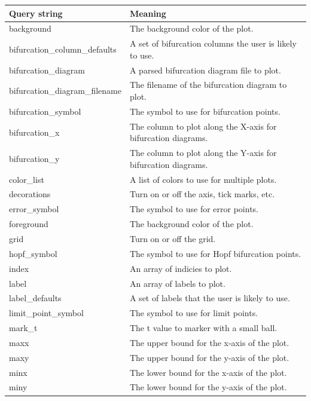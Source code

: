 \documentclass[12pt]{report}
\begin{document}
 \begin{longtable}{| l | l |}
 \hline
 Query string & Meaning \\
 \hline
 background  &  The background color of the plot. \\
 \hline
 bifurcation\_column\_defaults  & A set of bifurcation columns the user is likely to use. \\
 \hline
 bifurcation\_diagram  &  A parsed bifurcation diagram file to plot. \\
 \hline
 bifurcation\_diagram\_filename  & The filename of the bifurcation diagram to plot. \\
 \hline
 bifurcation\_symbol  &  The symbol to use for bifurcation points. \\ 
 \hline
 bifurcation\_x  & The column to plot along the X-axis for bifurcation diagrams. \\
 \hline
 bifurcation\_y  & The column to plot along the Y-axis for bifurcation diagrams. \\
 \hline
 color\_list  &  A list of colors to use for multiple plots. \\
 \hline
 decorations  & Turn on or off the axis, tick marks, etc. \\
 \hline
 error\_symbol  &    The symbol to use for error points. \\ 
 \hline
 foreground  &  The background color of the plot. \\
 \hline
 grid  &  Turn on or off the grid. \\
 \hline
 hopf\_symbol  &    The symbol to use for Hopf bifurcation points. \\ 
 \hline
 index  & An array of indicies to plot.\\
 \hline
 label  & An array of labels to plot.\\
 \hline
 label\_defaults  & A set of labels that the user is likely to use. \\
 \hline
 limit\_point\_symbol  &    The symbol to use for limit points. \\ 
 \hline
 mark\_t  &  The t value to marker with a small ball. \\      
 \hline
 maxx  & The upper bound for the x-axis of the plot. \\
 \hline
 maxy  & The upper bound for the y-axis of the plot. \\
 \hline
 minx  &  The lower bound for the x-axis of the plot. \\
 \hline
 miny  & The lower bound for the y-axis of the plot. \\

\end{longtable}
\end{document}
